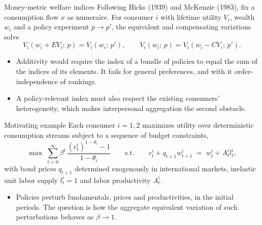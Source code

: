 \documentclass[aspectratio=169,11pt]{beamer}
\begin{document}
\begin{frame}{Money-metric welfare indices}
  \small Following Hicks (1939) and McKenzie (1983), fix a consumption flow
  $x$ as numeraire. For consumer $i$ with lifetime utility $V_i$, wealth
  $w_i$ and a policy experiment $p \to p'$, the equivalent and compensating
  variations solve
  \[ V_i\!\left(w_i + EV_i;\,p\right) = V_i\!\left(w_i;\,p'\right),
     \qquad
     V_i\!\left(w_i;\,p\right) = V_i\!\left(w_i - CV_i;\,p'\right). \]
  \begin{itemize}
    \item Additivity would require the index of a bundle of policies to
          equal the sum of the indices of its elements. It fails for general
          preferences, and with it order-independence of rankings.
    \item A policy-relevant index must also respect the existing consumers'
          heterogeneity, which makes interpersonal aggregation the second
          obstacle.
  \end{itemize}
\end{frame}

\begin{frame}{Motivating example}
  \small Each consumer $i=1,2$ maximizes utility over deterministic
  consumption streams subject to a sequence of budget constraints,
  \[ \max \;\sum_{t=0}^{\infty} \beta^{t}\,
        \frac{\left(c^{i}_{t}\right)^{1-\theta_i}-1}{1-\theta_i}
     \qquad \text{s.t.}\qquad
     c^{i}_{t} + q_{t+1} w^{i}_{t+1} \;=\; w^{i}_{t} + A^{i}_{t} l^{i}_{t}, \]
  with bond prices $q_{t+1}$ determined exogenously in international
  markets, inelastic unit labor supply $l^i_t=1$ and labor productivity
  $A^i_t$.
  \begin{itemize}
    \item Policies perturb fundamentals, prices and productivities, in the
          initial periods. The question is how the aggregate equivalent
          variation of such perturbations behaves as $\beta \to 1$.
  \end{itemize}
\end{frame}
\end{document}
